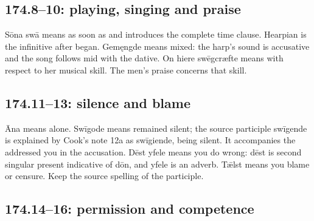\subsection*{174.8–10: playing, singing and praise}

Sōna swā means as soon as and introduces the complete time clause. Hearpian is the infinitive after began. Gemęngde means mixed: the harp’s sound is accusative and the song follows mid with the dative. On hiere swēgcræfte means with respect to her musical skill. The men’s praise concerns that skill.

\subsection*{174.11–13: silence and blame}

Āna means alone. Swīgode means remained silent; the source participle swīgende is explained by Cook’s note 12a as swīgiende, being silent. It accompanies the addressed you in the accusation. Dēst yfele means you do wrong: dēst is second singular present indicative of dōn, and yfele is an adverb. Tǣlst means you blame or censure. Keep the source spelling of the participle.

\subsection*{174.14–16: permission and competence}

